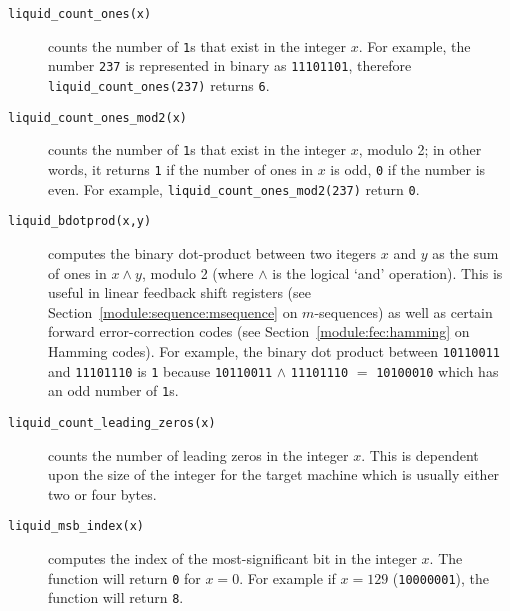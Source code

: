 \begin{description}
\item[{\tt liquid\_count\_ones(x)}]
    counts the number of {\tt 1}s that exist in the integer $x$.
    For example, the number {\tt 237} is represented in binary as
    {\tt 11101101}, therefore {\tt liquid\_count\_ones(237)} returns {\tt 6}.
\item[{\tt liquid\_count\_ones\_mod2(x)}]
    counts the number of {\tt 1}s that exist in the integer $x$, modulo 2; in
    other words, it returns {\tt 1} if the number of ones in $x$ is odd,
    {\tt 0} if the number is even.
    For example, {\tt liquid\_count\_ones\_mod2(237)} return {\tt 0}.
\item[{\tt liquid\_bdotprod(x,y)}]
    computes the binary dot-product between two itegers $x$ and $y$ as the sum
    of ones in $x \land y$, modulo 2 (where $\land$ is the logical `and'
    operation).
    This is useful in linear feedback shift registers
    (see Section~\ref{module:sequence:msequence} on $m$-sequences)
    as well as certain forward error-correction codes
    (see Section~\ref{module:fec:hamming} on Hamming codes).
    For example, the binary dot product between
    {\tt 10110011} and
    {\tt 11101110} is
    {\tt 1} because
    {\tt 10110011} $\land$ {\tt 11101110} $=$ {\tt 10100010} which has an odd
    number of {\tt 1}s.
\item[{\tt liquid\_count\_leading\_zeros(x)}]
    counts the number of leading zeros in the integer $x$.
    This is dependent upon the size of the integer for the target machine
    which is usually either two or four bytes.
\item[{\tt liquid\_msb\_index(x)}]
    computes the index of the most-significant bit in the integer $x$.
    The function will return {\tt 0} for $x=0$.
    For example if $x=129$ ({\tt 10000001}), the function will return {\tt 8}.
\end{description}


